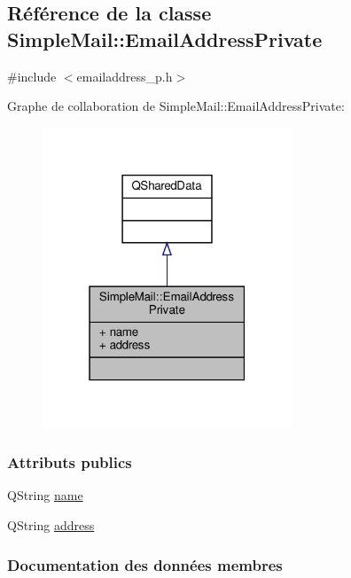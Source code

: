 \hypertarget{class_simple_mail_1_1_email_address_private}{}\subsection{Référence de la classe Simple\+Mail\+:\+:Email\+Address\+Private}
\label{class_simple_mail_1_1_email_address_private}


{\ttfamily \#include $<$emailaddress\+\_\+p.\+h$>$}



Graphe de collaboration de Simple\+Mail\+:\+:Email\+Address\+Private\+:\nopagebreak
\begin{figure}[H]
\begin{center}
\leavevmode
\includegraphics[width=211pt]{class_simple_mail_1_1_email_address_private__coll__graph}
\end{center}
\end{figure}
\subsubsection*{Attributs publics}
\begin{DoxyCompactItemize}
\item 
Q\+String \hyperlink{class_simple_mail_1_1_email_address_private_ae60cdddafe1a563cff906aa5896ba3a6}{name}
\item 
Q\+String \hyperlink{class_simple_mail_1_1_email_address_private_a7936750652c9a1388b9e24c3a9fce0ed}{address}
\end{DoxyCompactItemize}


\subsubsection{Documentation des données membres}
\mbox{\label{class_simple_mail_1_1_email_address_private_a7936750652c9a1388b9e24c3a9fce0ed}} 
